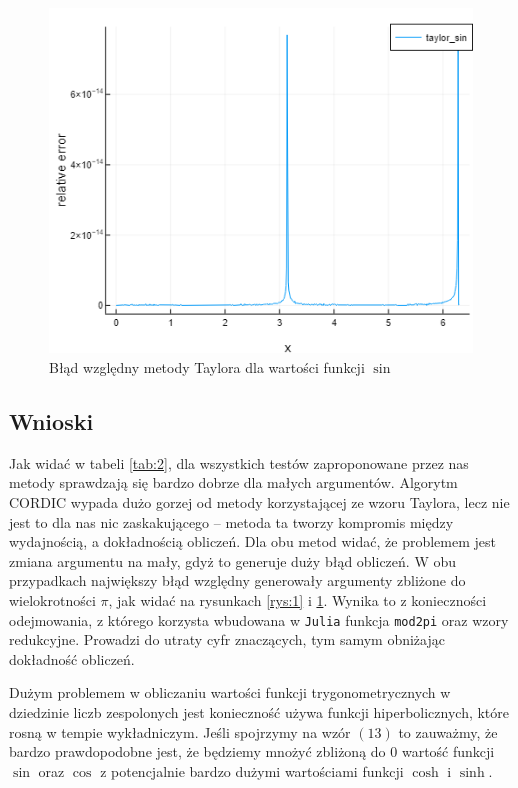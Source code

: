 \documentclass{mwart}
\theoremstyle{remark}
\theoremstyle{definition}
\theoremstyle{definition}
\begin{document}
\begin{figure}[H]
\centering
    \includegraphics[scale = 0.9]{taylor error.png}
\caption{Błąd względny metody Taylora dla wartości funkcji $\sin$}
\label{rys:2}
\end{figure}


\subsection{Wnioski}
Jak widać w tabeli \ref{tab:2}, dla wszystkich testów zaproponowane przez nas metody sprawdzają 
się bardzo dobrze dla małych argumentów. Algorytm CORDIC wypada dużo gorzej od metody korzystającej 
ze wzoru Taylora, lecz nie jest to dla nas nic zaskakującego -- metoda ta tworzy kompromis 
między wydajnością, a dokładnością obliczeń. Dla obu metod widać, że problemem jest zmiana 
argumentu na mały, gdyż to generuje duży błąd obliczeń. W obu przypadkach największy błąd względny
generowały argumenty zbliżone do wielokrotności $\pi$, jak widać na rysunkach \ref{rys:1} i \ref{rys:2}. Wynika to z konieczności odejmowania, 
z którego korzysta wbudowana w \texttt{Julia} funkcja \texttt{mod2pi} oraz wzory redukcyjne.
Prowadzi do utraty cyfr znaczących, tym samym obniżając dokładność obliczeń.

Dużym problemem w obliczaniu wartości funkcji trygonometrycznych w dziedzinie liczb zespolonych jest konieczność używa funkcji hiperbolicznych, które rosną w tempie wykładniczym. Jeśli spojrzymy na wzór $(13)$ to zauważmy, że bardzo prawdopodobne jest, że będziemy mnożyć zbliżoną do $0$ wartość funkcji $\sin$ oraz $\cos$ z potencjalnie bardzo dużymi wartościami funkcji $\cosh$ i $\sinh$. 
\end{document}
